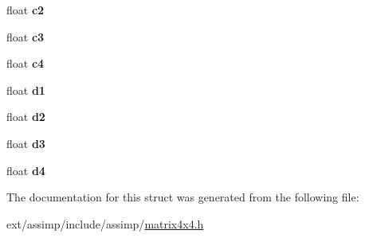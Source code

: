 \begin{DoxyCompactItemize}
\item 
\hypertarget{structai_matrix4x4_a67425f81054b1097c29b73bf317cfeeb}{float {\bfseries c2}}\label{structai_matrix4x4_a67425f81054b1097c29b73bf317cfeeb}

\item 
\hypertarget{structai_matrix4x4_aec8c5745b90139d472eb4e91f1373c1a}{float {\bfseries c3}}\label{structai_matrix4x4_aec8c5745b90139d472eb4e91f1373c1a}

\item 
\hypertarget{structai_matrix4x4_a7e3288f38a4e00d55c02272e1582e462}{float {\bfseries c4}}\label{structai_matrix4x4_a7e3288f38a4e00d55c02272e1582e462}

\item 
\hypertarget{structai_matrix4x4_a13f3800d9106e3be6d0e60b794c5a5ae}{float {\bfseries d1}}\label{structai_matrix4x4_a13f3800d9106e3be6d0e60b794c5a5ae}

\item 
\hypertarget{structai_matrix4x4_a6f17ca1c7e4b9377d0e332f85aab282b}{float {\bfseries d2}}\label{structai_matrix4x4_a6f17ca1c7e4b9377d0e332f85aab282b}

\item 
\hypertarget{structai_matrix4x4_a8d2910f62b34b1e2ace93b55e4db4b92}{float {\bfseries d3}}\label{structai_matrix4x4_a8d2910f62b34b1e2ace93b55e4db4b92}

\item 
\hypertarget{structai_matrix4x4_ac0a65b51f126f7331b4f7dbbd82f3d63}{float {\bfseries d4}}\label{structai_matrix4x4_ac0a65b51f126f7331b4f7dbbd82f3d63}

\end{DoxyCompactItemize}


The documentation for this struct was generated from the following file\-:\begin{DoxyCompactItemize}
\item 
ext/assimp/include/assimp/\hyperlink{matrix4x4_8h}{matrix4x4.\-h}\end{DoxyCompactItemize}
